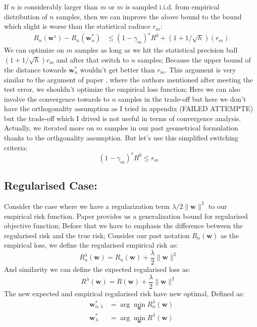 \documentclass[11pt, a4paper, reqno, twoside]{scrartcl}
\theoremstyle{style}
\newcommand{\wv}{\bm{w}}
\newcommand{\0}{\mathbf{0}} %
\begin{document}
	If $n$ is considerably larger than $m$ or $m$ is sampled i.i.d. from empirical
	distribution of $n$ samples, then we can improve the above bound to the bound
	which slight is worse than the statistical radiuce $r_m$: 
	\begin{eqnarray*} 
		& R_n(\wv^s) - R_n(\wv^*_n) & \leq (1-\gamma_m)^s R^0 + (1+1/\sqrt{h})(
		r_m)
	\end{eqnarray*}
	We can optimize on $m$ samples as long as we hit the statistical precision ball
	$(1+1/\sqrt{h} )r_m$ and after that switch to $n$ samples; Because the upper
	bound of the distance towards $\wv_n^*$ wouldn't get better than $r_m$. This
	argument is very similar to the argument of paper \cite{bousquet2008tradeoffs},
	where the authors mentioned after meeting the test error, we shouldn't
	optimize the empirical loss function;
	Here we can also involve the convergence towards to $n$ samples in the
	trade-off but here we don't have the orthogonality assumption as I tried in
	appendix (FAILED ATTEMPTE) but the trade-off which I drived is not
	useful in terms of convergence analysis. Actually, we iterated more on $m$
	samples in our past geometrical formulation thanks to the orthgonality
	assumption. But let's use
	this simplified switching criteria:
	\begin{equation*}
		 (1-\gamma_m)^s R^0 \leq 
		r_m 
	\end{equation*}
\subsection{Regularised Case:}
Consider the case where we have a regularization term $\lambda/2 \|\wv\|^2$ to
our empirical risk function. Paper \cite{sridharan2009fast} provides us
a generalization bound for regularised objective function; 
Before that we have to emphasis the difference between the regularised risk
and the true risk; Consider our past notation $R_n(\wv)$ as the empirical loss,
we define the regularised empirical risk as: 
\begin{equation*}
	R_n^{\lambda} (\wv) = R_n(\wv) + \frac{\lambda}{2} \| \wv  \|^2
\end{equation*}
And similarity we can define the expected regularised loss as: 
\begin{equation*}
	R^{\lambda}(\wv) = R(\wv) + \frac{\lambda}{2} \|\wv\|^2
\end{equation*}
The new expected and empirical regularised risk have new optimal, Defined as: 
\begin{eqnarray*}
	& \wv^*_{n,\lambda} & = \arg \min_{\wv} R_n^{\lambda}(\wv) \\ 
	& \wv^*_{\lambda} & = \arg \min_{\wv} R^{\lambda}(\wv)
\end{eqnarray*} 
\end{document}
